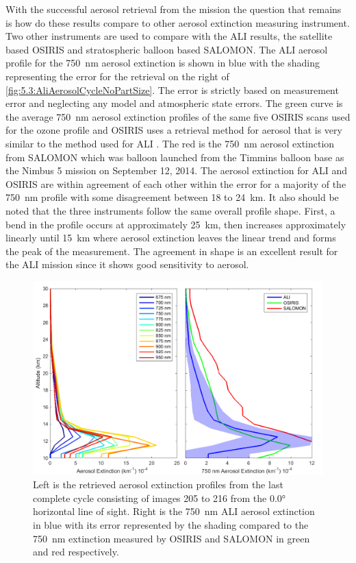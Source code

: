 With the successful aerosol retrieval from the mission the question that remains is how do these results compare to other aerosol extinction measuring instrument. Two other instruments are used to compare with the ALI results, the satellite based OSIRIS and stratospheric balloon based SALOMON. The ALI aerosol profile for the 750~nm aerosol extinction is shown in blue with the shading representing the error for the retrieval on the right of \autoref{fig:5.3:AliAerosolCycleNoPartSize}. The error is strictly based on measurement error and neglecting any model and atmospheric state errors. The green curve is the average 750~nm aerosol extinction profiles of the same five OSIRIS scans used for the ozone profile and OSIRIS uses a retrieval method for aerosol that is very similar to the method used for ALI \citep{Bourassa2007,Bourassa2011}. The red is the 750~nm aerosol extinction from SALOMON \citep{Berthet2002} which was balloon launched from the Timmins balloon base as the Nimbus 5 mission on September 12, 2014. The aerosol extinction for ALI and OSIRIS are within agreement of each other within the error for a majority of the 750~nm profile with some disagreement between 18 to 24~km. It also should be noted that the three instruments follow the same overall profile shape.  First, a bend in the profile occurs at approximately 25~km, then increases approximately linearly until 15~km where aerosol extinction leaves the linear trend and forms the peak of the measurement. The agreement in shape is an excellent result for the ALI mission since it shows good sensitivity to aerosol.

\begin{figure}
\includegraphics[width=1.0\textwidth]{./Images/5-3-FullAerosolCycleComparisonNoPartSize.pdf}
    \caption[Aerosol Retrievals for All Wavelengths and 750~nm Comparison with OSIRIS and SALOMON]{Left is the retrieved aerosol extinction profiles from the last complete cycle consisting of images 205 to 216 from the 0.0\si{\degree} horizontal line of sight. Right is the 750~nm ALI aerosol extinction in blue with its error represented by the shading compared to the 750~nm extinction measured by OSIRIS and SALOMON in green and red respectively.}
    \label{fig:5.3:AliAerosolCycleNoPartSize}
\end{figure}

